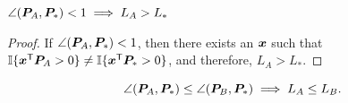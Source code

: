 \documentclass[10pt]{article}
\begin{document}
\begin{lem}
$\angle(\boldsymbol{P}_A, \boldsymbol{P}_*) <1  \implies L_A > L_*$
\end{lem}


\begin{proof}
If $\angle(\boldsymbol{P}_A, \boldsymbol{P}_*) <1$, then there exists an $\boldsymbol{x}$ such that $\mathbb{I}\{ \boldsymbol{x}^{\mathsf{T}} \boldsymbol{P}_A >0 \} \neq \mathbb{I}\{ \boldsymbol{x}^{\mathsf{T}} \boldsymbol{P}_* >0 \}$, and therefore, $L_A > L_*$.
\end{proof}



\begin{lem}
\label{q:a2}
$$\angle(\boldsymbol{P}_A,\boldsymbol{P}_*) \leq \angle(\boldsymbol{P}_B,\boldsymbol{P}_*) \implies L_A \leq L_B.$$
\end{lem}
\end{document}
